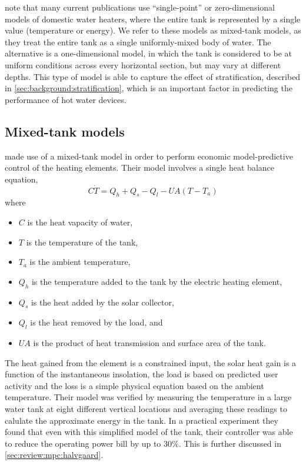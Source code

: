 \textcite{Vrettos12} note that many current publications use ``single-point'' or zero-dimensional models of domestic water heaters, where the entire tank is represented by a single value (temperature or energy).
We refer to these models as mixed-tank models, as they treat the entire tank as a single uniformly-mixed body of water.
The alternative is a one-dimensional model, in which the tank is considered to be at uniform conditions across every horizontal section, but may vary at different depths.
This type of model is able to capture the effect of stratification, described in \autoref{sec:background:stratification}, which is an important factor in predicting the performance of hot water devices.

\subsection{Mixed-tank models}
\label{sec:review:mixed-tank}


\textcite{Halvgaard12} made use of a mixed-tank model in order to perform economic model-predictive control of the heating elements.
Their model involves a single heat balance equation,
$$ C \dot{T} = Q_h + Q_s - Q_l - U A (T - T_a) $$
where
\begin{itemize}
   \item $C$ is the heat vapacity of water,
   \item $T$ is the temperature of the tank,
   \item $T_a$ is the ambient temperature,
   \item $Q_h$ is the temperature added to the tank by the electric heating element,
   \item $Q_s$ is the heat added by the solar collector,
   \item $Q_l$ is the heat removed by the load, and
   \item $U A$ is the product of heat transmission and surface area of the tank.
\end{itemize}
The heat gained from the element is a constrained input, the solar heat gain is a function of the instantaneous insolation, the load is based on predicted user activity and the loss is a simple physical equation based on the ambient temperature.
Their model was verified by measuring the temperature in a large water tank at eight different vertical locations and averaging these readings to calulate the approximate energy in the tank.
In a practical experiment they found that even with this simplified model of the tank, their controller was able to reduce the operating power bill by up to 30\%.
This is further discussed in \autoref{sec:review:mpc:halvgaard}.

